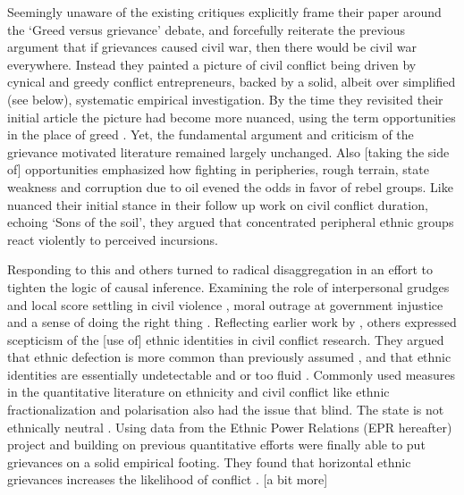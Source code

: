\documentclass[12pt]{article}
\begin{document}
Seemingly unaware of the existing critiques \citet{Collier2004} explicitly frame
their paper around the `Greed versus grievance' debate, and forcefully reiterate
the previous argument that if grievances caused civil war, then there would be
civil war everywhere. Instead they painted a picture of civil conflict being
driven by cynical and greedy conflict entrepreneurs, backed by a solid, albeit
over simplified (see below), systematic empirical investigation. By the time
they revisited their initial article the picture had become more nuanced, using
the term opportunities in the place of greed \citep{Collier2009}. Yet, the
fundamental argument and criticism of the grievance motivated literature
remained largely unchanged. Also [taking the side of] opportunities
\citet{Fearon2003} emphasized how fighting in peripheries, rough terrain, state
weakness and corruption due to oil evened the odds in favor of rebel groups.
Like \citet{Collier2009} \citet{Fearon_2004} nuanced their initial stance in
their follow up work on civil conflict duration, echoing
\citet{WeinerMyron1978SotS} `Sons of the soil', they argued that concentrated
peripheral ethnic groups react violently to perceived incursions.

Responding to this \citet{Kalyvas2006} and others turned to radical
disaggregation in an effort to tighten the logic of causal inference. Examining
the role of interpersonal grudges and local score settling in civil violence
\citep{Kalyvas2006, Kalyvas_2008}, moral outrage at government injustice and a
sense of doing the right thing \citep{Wood2003}. Reflecting earlier work by
\citet{barth1969}, others expressed scepticism of the [use of] ethnic identities
in civil conflict research. They argued that ethnic defection is more common
than previously assumed \citep{Kalyvas_2008, Staniland_2012}, and that ethnic
identities are essentially undetectable and or too fluid \citep{Gilley_2004,
Chandra2006}. Commonly used measures in the quantitative literature on ethnicity
and civil conflict like ethnic fractionalization \citep{Alesina2003,
Posner2004} and polarisation \citep{Montalvo2005} also had the issue that 
blind. The state is not ethnically neutral \citep{CedermanLars-Erik2013Igac}.
Using data from the Ethnic Power Relations (EPR hereafter) project
\citet{CedermanLars-Erik2013Igac} and building on previous quantitative efforts
\citep{Gurr_1993, Goldstone_2010} were finally able to put grievances on a solid
empirical footing. They found that horizontal ethnic grievances
increases the likelihood of conflict \citep{CedermanLars-Erik2013Igac}. [a bit
more]
\end{document}
